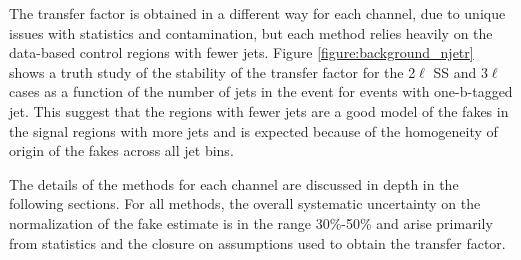 The transfer factor is obtained in a different way for each channel, due to unique issues with statistics and contamination, but each method relies heavily on the data-based control regions with fewer jets. Figure \ref{figure:background_njetr} shows a truth study of the stability of the transfer factor for the 2$\ell$ SS and 3$\ell$ cases as a function of the number of jets in the event for events with one-b-tagged jet. This suggest that the regions with fewer jets are a good model of the fakes in the signal regions with more jets and is expected because of the homogeneity of origin of the fakes across all jet bins.  

The details of the methods for each channel are discussed in depth in the following sections. For all methods, the overall systematic uncertainty on the normalization of the fake estimate is in the range 30\%-50\% and arise primarily from statistics and the closure on assumptions used to obtain the transfer factor.

